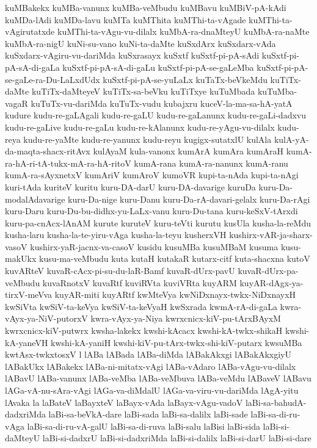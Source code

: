 {kuMBakekx
kuMBa-vanunx
kuMBa-veMbudu
kuMBavu
kuMBiV-pA-kAdi
kuMDa-lAdi
kuMDa-lavu
kuMTa
kuMThita
kuMThi-ta-vAgade
kuMThi-ta-vAgirutatxde
kuMThi-ta-vAgu-vu-dilalx
kuMbA-ra-dnaMteyU
kuMbA-ra-naMte
kuMbA-ra-nigU
kuNi-su-vano
kuNi-ta-daMte
kuSxdArx
kuSxdarx-vAda
kuSxdarx-vAgiru-vu-dariMda
kuSxrasayx
kuSxtf
kuSxtf-pi-pA-sAdi
kuSxtf-pi-pA-sA-di-gaLa
kuSxtf-pi-pA-sA-di-gaLu
kuSxtf-pi-pA-se-gaLeMba
kuSxtf-pi-pA-se-gaLe-ra-Du-LaLxdUdx
kuSxtf-pi-pA-se-yuLaLx
kuTaTx-beVkeMdu
kuTiTx-daMte
kuTiTx-daMteyeV
kuTiTx-sa-beVku
kuTiTxye
kuTuMbada
kuTuMba-vagaR
kuTuTx-vu-dariMda
kuTuTx-vudu
kubajxru
kuceV-la-ma-sa-hA-yatA
kudure
kudu-re-gaLAgali
kudu-re-gaLU
kudu-re-gaLanunx
kudu-re-gaLi-dadxvu
kudu-re-gaLive
kudu-re-gaLu
kudu-re-kAlanunx
kudu-re-yAgu-vu-dilalx
kudu-reya
kudu-re-yaMte
kudu-re-yanunx
kudu-reyu
kugigx-sutatxlU
kulAla
kulA-yA-da-maqta-shacx-ritAvx
kulAyaM
kula-vanonx
kumArA
kumAra
kumAraH
kumA-ra-hA-ri-tA-tukx-mA-ra-hA-ritoV
kumA-rana
kumA-ra-nanunx
kumA-ranu
kumA-ra-sAyxnetxV
kumAriV
kumAroV
kumoVR
kupi-ta-nAda
kupi-ta-nAgi
kuri-tAda
kuriteV
kuritu
kuru-DA-darU
kuru-DA-davarige
kuruDa
kuru-Da-modalAdavarige
kuru-Da-nige
kuru-Danu
kuru-Da-rA-davari-gelalx
kuru-Da-rAgi
kuru-Daru
kuru-Du-bu-didhx-yu-LaLx-vanu
kuru-Du-tana
kuru-keSxV-tArxdi
kuru-pa-cnAcx-lAnAM
kurute
kuruteV
kuru-teVti
kurutu
kusUla
kusha-la-reMdu
kusha-laru
kusha-la-te-yiru-vAga
kusha-la-teyu
kusherxVH
kushirx-vAR-ja-sharx-vasoV
kushirx-yaR-jacnx-va-casoV
kusidu
kusuMBa
kusuMBaM
kusuma
kusu-makUkx
kusu-ma-veMbudu
kuta
kutaH
kutakaR
kutarx-citf
kuta-shacxna
kutoV
kuvARteV
kuvaR-cAcx-pi-su-du-laR-Bamf
kuvaR-dUrx-pavU
kuvaR-dUrx-pa-veMbudu
kuvaRnotxV
kuvaRtf
kuviRVta
kuviVRta
kuyARM
kuyAR-dAgx-ya-tirxV-meVva
kuyAR-miti
kuyARtf
kwMteVya
kwNiDxnayx-twkx-NiDxnayxH
kwSiVta
kwSiV-ta-keVya
kwSiV-ta-keVyaH
kwSxrada
kwmA-rA-di-gaLa
kwra-vAyx-ya-NiV-putorxV
kwra-vAyx-ya-Niya
kwrxcnicx-kiV-pu-tArxBAyxM
kwrxcnicx-kiV-putwrx
kwsha-lakekx
kwshi-kAcacx
kwshi-kA-twkx-shikaH
kwshi-kA-yaneVH
kwshi-kA-yaniH
kwshi-kiV-pu-tArx-twkx-shi-kiV-putarx
kwsuMBa
kwtAsx-twkxtosxV
l
lABa
lABada
lABa-diMda
lABakAkxgi
lABakAkxgiyU
lABakUkx
lABakekx
lABa-ni-mitatx-vAgi
lABa-vAdaro
lABa-vAgu-vu-dilalx
lABavU
lABa-vanunx
lABa-veMba
lABa-veMbuva
lABa-veMdu
lABaveV
lABavu
lAGa-vA-nu-sAra-vAgi
lAGa-va-diMdalU
lAGa-va-viru-vu-dariMda
lAgA-yitu
lAvaka
la
laBateV
laBayxteV
laBayx-vAda
laBayx-vAgu-vadoV
laBi-sa-bahudA-dadxriMda
laBi-sa-beVkA-dare
laBi-sada
laBi-sa-dalilx
laBi-sade
laBi-sa-di-ru-vAga
laBi-sa-di-ru-vA-galU
laBi-sa-di-ruva
laBi-salu
laBisi
laBi-sida
laBi-si-daMteyU
laBi-si-dadxrU
laBi-si-dadxriMda
laBi-si-dalilx
laBi-si-darU
laBi-si-dare
}
